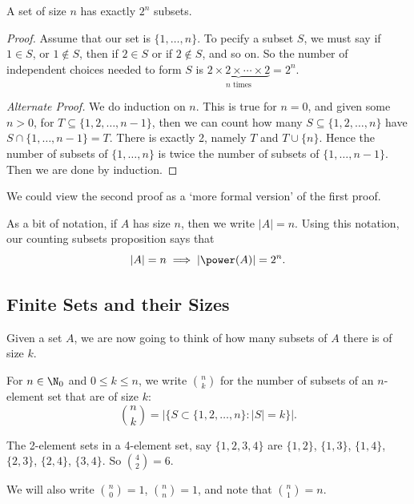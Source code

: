 \begin{proposition}
	A set of size $n$ has exactly $2^n$ subsets.
\end{proposition}
\begin{proof}
	Assume that our set is $\{1, \dots, n\}$. To pecify a subset $S$, we must say if $1 \in S$, or $1 \not\in S$, then if $2 \in S$ or if $2 \not\in S$, and so on. So the number of independent choices needed to form $S$ is $\underbrace{2 \times 2 \times \cdots \times 2}_{\text{$n$ times}} = 2^n$.

	\emph{Alternate Proof.}
	We do induction on $n$. This is true for $n = 0$, and given some $n > 0$, for $T \subseteq \{1, 2, \dots, n - 1\}$, then we can count how many $S \subseteq \{1, 2, \dots, n\}$ have $S \cap \{1, \dots, n - 1\} = T$. There is exactly 2, namely $T$ and $T \cup \{n\}$. Hence the number of subsets of $\{1, \dots, n\}$ is twice the number of subsets of $\{1, \dots, n - 1\}$. Then we are done by induction.
\end{proof}
\begin{remark}
	We could view the second proof as a `more formal version' of the first proof.
\end{remark}

As a bit of notation, if $A$ has size $n$, then we write $|A| = n$. Using this notation, our counting subsets proposition says that
$$
|A| = n \implies |\power(A)| = 2^n.
$$

\subsection{Finite Sets and their Sizes}

Given a set $A$, we are now going to think of how many subsets of $A$ there is of size $k$.

\begin{definition}
	For $n \in \N_0$ and $0 \leq k \leq n$, we write $\binom{n}{k}$ for the number of subsets of an $n$-element set that are of size $k$:
	$$
	\binom{n}{k} = \left|\{S \subset \{1, 2, \dots, n\} : |S| = k\}\right|.
	$$
\end{definition}

\begin{example}
	The 2-element sets in a 4-element set, say $\{1, 2, 3, 4\}$ are $\{1, 2\}$, $\{1, 3\}$, $\{1, 4\}$, $\{2, 3\}$, $\{2, 4\}$, $\{3, 4\}$. So $\binom{4}{2} = 6$.
\end{example}

We will also write $\binom{n}{0} = 1$, $\binom{n}{n} = 1$, and note that $\binom{n}{1} = n$.

